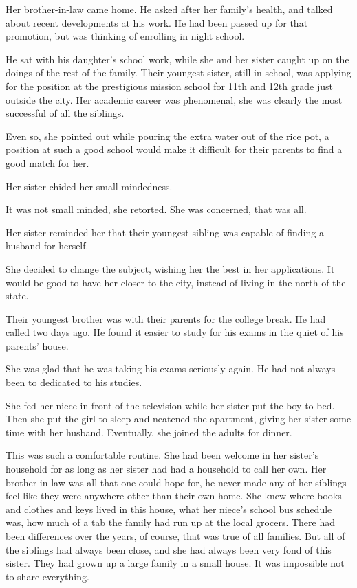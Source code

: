 \documentclass{article}
\newcommand{\egnote}{\todo[color=violet!30]}
\begin{document}
Her brother-in-law came home. He asked after her family's health, and talked about recent developments at his work. He had been passed up for that promotion, but was thinking of enrolling in night school. 

He sat with his daughter's school work, while she and her sister caught up on the doings of the rest of the family. Their youngest sister, still in school, was applying for the position at the prestigious mission school for 11th and 12th grade just outside the city. Her academic career was phenomenal, she was clearly the most successful of all the siblings. 

Even so, she pointed out while pouring the extra water out of the rice pot, a position at such a good school would make it difficult for their parents to find a good match for her. 

Her sister chided her small mindedness. 

It was not small minded, she retorted. She was concerned, that was all. 

Her sister reminded her that their youngest sibling was capable of finding a husband for herself. 

She decided to change the subject, wishing her the best in her applications. It would be good to have her closer to the city, instead of living in the north of the state. 

Their youngest brother was with their parents for the college break. He had called two days ago. He found it easier to study for his exams in the quiet of his parents' house. 

She was glad that he was taking his exams seriously again. He had not always been to dedicated to his studies.

She fed her niece in front of the television while her sister put the boy to bed. Then she put the girl to sleep and neatened the apartment, giving her sister some time with her husband. Eventually, she joined the adults for dinner.
 
This was such a comfortable routine. She had been welcome in her sister's household for as long as her sister had had a household to call her own. Her brother-in-law was all that one could hope for, he never made any of her\egnote{his wife's?} siblings feel like they were anywhere other than their own home. She knew where books and clothes and keys lived in this house, what her niece's school bus schedule was, how much of a tab the family had run up at the local grocers. There had been differences over the years, of course, that was true of all families. But all of the siblings had always been close, and she had always been very fond of this sister. They had grown up a large family in a small house. It was impossible not to share everything. 
\end{document}
